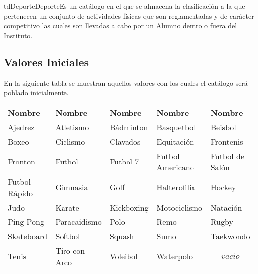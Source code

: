 \begin{TipoDeDato}{tdDeporte}{Deporte}{Es un catálogo en el que se almacena la clasificación a la que pertenecen un conjunto de actividades físicas que son reglamentadas y de carácter competitivo las cuales son llevadas a cabo por un Alumno dentro o fuera del Instituto.}
	
	\begin{tdAtributos}
		
		

	\end{tdAtributos}
	
	\subsection{Valores Iniciales}
	
 En la siguiente tabla se muestran aquellos valores con los cuales el catálogo será poblado inicialmente. \cdtEmpty

		\begin{longtable}{| p{}| p{}|p{}|p{}| p{}|}
	 			\rowcolor{colorPrincipal}
	 			\multicolumn{5}{|c|}{\bf \color{white} Valores Iniciales}\\
	 			\hline
	 			\rowcolor{colorSecundario}
	 			\bf \color{white} Nombre & \bf\color{white} Nombre & \bf\color{white} Nombre & \bf\color{white}Nombre & \bf\color{white} Nombre \\
				\hline
				Ajedrez &Atletismo &Bádminton & Basquetbol & Beisbol\\
				\hline
				Boxeo& Ciclismo & Clavados & Equitación & Frontenis\\
				\hline
				Fronton & Futbol & Futbol 7 & Futbol Americano & Futbol de Salón\\
				\hline
			        Futbol Rápido& Gimnasia & Golf  & Halterofilia & Hockey\\
				\hline
				Judo & Karate & Kickboxing & Motociclismo & Natación\\
				\hline
				Ping Pong & Paracaidismo & Polo & Remo &  Rugby \\
				\hline
				Skateboard & Softbol  & Squash  & Sumo& Taekwondo \\
				\hline
				Tenis &Tiro con Arco & Voleibol  & Waterpolo & \[vacio\]\\
				\hline
	 		\end{longtable}
\end{TipoDeDato}
	